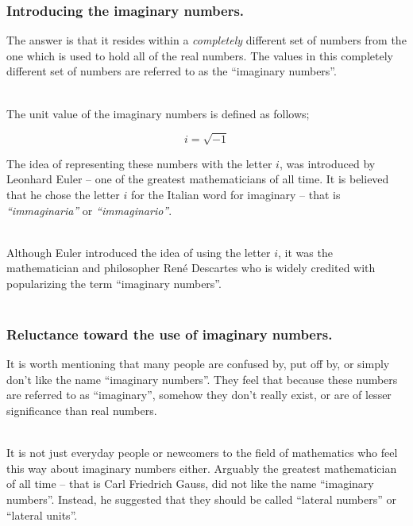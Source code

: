 %
%

\begin{frame}
\frametitle{Introducing the imaginary numbers.}

The answer is that it resides within a \textit{completely} different set of numbers from the one which is used to hold all of the real numbers. The values in this
completely different set of numbers are referred to as the ``imaginary numbers''.\\~\

The unit value of the imaginary numbers is defined as follows;

\begin{equation}
  i = \sqrt{-1}
\end{equation}

The idea of representing these numbers with the letter \(i\), was introduced by Leonhard Euler -- one of the greatest mathematicians of all time. It is believed
that he chose the letter \(i\) for the Italian word for imaginary -- that is \textit{``immaginaria''} or \textit{``immaginario''}.\\~\

Although Euler introduced the idea of using the letter \(i\), it was the mathematician and philosopher Ren\'e Descartes who is widely credited with popularizing
the term ``imaginary numbers''.\\~\

\end{frame}


%
%

\begin{frame}
\frametitle{Reluctance toward the use of imaginary numbers.}

It is worth mentioning that many people are confused by, put off by, or simply don't like the name ``imaginary numbers''. They feel that because these numbers
are referred to as ``imaginary'', somehow they don't really exist, or are of lesser significance than real numbers.\\~\

It is not just everyday people or newcomers to the field of mathematics who feel this way about imaginary numbers either. Arguably the greatest mathematician
of all time -- that is Carl Friedrich Gauss, did not like the name ``imaginary numbers''. Instead, he suggested that they should be called ``lateral numbers'' or
``lateral units''.\\~\

\end{frame}


